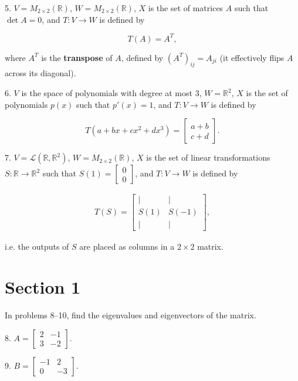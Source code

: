 \documentclass{article}
\begin{document}
5. $V = M_{2 \times 2}(\mathbb{R})$, $W = M_{2 \times 2}(\mathbb{R})$, $X$ is the set of matrices $A$ such that $\det A = 0$, and $T : V \to W$ is defined by

$$
	T(A) = A^T,
$$

where $A^T$ is the \textbf{transpose} of $A$, defined by $(A^T)_{ij} = A_{ji}$ (it effectively flips $A$ across its diagonal).

6. $V$ is the space of polynomials with degree at most 3, $W = \mathbb{R}^2$, $X$ is the set of polynomials $p(x)$ such that $p'(x) = 1$, and $T : V \to W$ is defined by

$$
	T(a + bx + cx^2 + dx^3) = \left[\begin{array}{c} a + b \\ c + d \end{array}\right].
$$

7. $V = \mathcal{L}(\mathbb{R}, \mathbb{R}^2)$, $W = M_{2 \times 2}(\mathbb{R})$, $X$ is the set of linear transformations $S : \mathbb{R} \to \mathbb{R}^2$ such that $S(1) = \left[\begin{array}{c} 0 \\ 0 \end{array}\right]$, and $T : V \to W$ is defined by

\begin{align*}
	T(S) = \left[\begin{array}{cc} \mid& \mid \\ S(1)& S(-1) \\ \mid& \mid \end{array}\right],
\end{align*}

i.e. the outputs of $S$ are placed as columns in a $2 \times 2$ matrix.

\section{Section 1}

In problems 8--10, find the eigenvalues and eigenvectors of the matrix.

8. $A = \left[\begin{array}{cc} 2& -1 \\ 3& -2 \end{array}\right]$.

9. $B = \left[\begin{array}{cc} -1& 2 \\ 0& -3 \end{array}\right]$.
\end{document}
